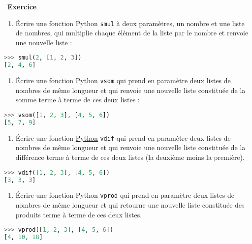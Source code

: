 \documentclass[
  11pt,
]{article}
\newcommand{\passthrough}[1]{#1}
\providecommand{\tightlist}{%
  \setlength{\itemsep}{0pt}\setlength{\parskip}{0pt}}
\newcounter{exo}
\newenvironment{exercice}[1]
{\par \medskip   \addtocounter{exo}{1} \noindent  
\begin{bclogo}[arrondi =0.1,   noborder = true, logo=\bccrayon, marge=4]{~\textbf{Exercice} \textbf{\theexo} {\itshape #1} }  \par}
{
\end{bclogo}
 \par \bigskip }
\newcounter{def}
\begin{document}
\begin{exercice}{}

\begin{enumerate}
\def\labelenumi{\arabic{enumi}.}
\tightlist
\item
  Écrire une fonction Python \passthrough{\lstinline!smul!} à deux
  paramètres, un nombre et une liste de nombres, qui multiplie chaque
  élément de la liste par le nombre et renvoie une nouvelle liste :
\end{enumerate}

\begin{lstlisting}[language=Python]
>>> smul(2, [1, 2, 3])
[2, 4, 6]
\end{lstlisting}

\begin{enumerate}
\def\labelenumi{\arabic{enumi}.}
\setcounter{enumi}{1}
\tightlist
\item
  Écrire une fonction Python \passthrough{\lstinline!vsom!} qui prend en
  paramètre deux listes de nombres de même longueur et qui renvoie une
  nouvelle liste constituée de la somme terme à terme de ces deux listes
  :
\end{enumerate}

\begin{lstlisting}[language=Python]
>>> vsom([1, 2, 3], [4, 5, 6])
[5, 7, 9]
\end{lstlisting}

\begin{enumerate}
\def\labelenumi{\arabic{enumi}.}
\setcounter{enumi}{2}
\tightlist
\item
  Écrire une fonction
  \href{https://docs.python.org/3/tutorial/datastructures.html}{Python}
  \passthrough{\lstinline!vdif!} qui prend en paramètre deux listes de
  nombres de même longueur et qui renvoie une nouvelle liste constituée
  de la différence terme à terme de ces deux listes (la deuxième moins
  la première).
\end{enumerate}

\begin{lstlisting}[language=Python]
>>> vdif([1, 2, 3], [4, 5, 6])
[3, 3, 3]
\end{lstlisting}

\begin{enumerate}
\def\labelenumi{\arabic{enumi}.}
\setcounter{enumi}{3}
\tightlist
\item
  Écrire une fonction Python \passthrough{\lstinline!vprod!} qui prend
  en paramètre deux listes de nombres de même longueur et qui retourne
  une nouvelle liste constituée des produits terme à terme de ces deux
  listes.
\end{enumerate}

\begin{lstlisting}[language=Python]
>>> vprod([1, 2, 3], [4, 5, 6]) 
[4, 10, 18]
\end{lstlisting}

\end{exercice}
\end{document}
